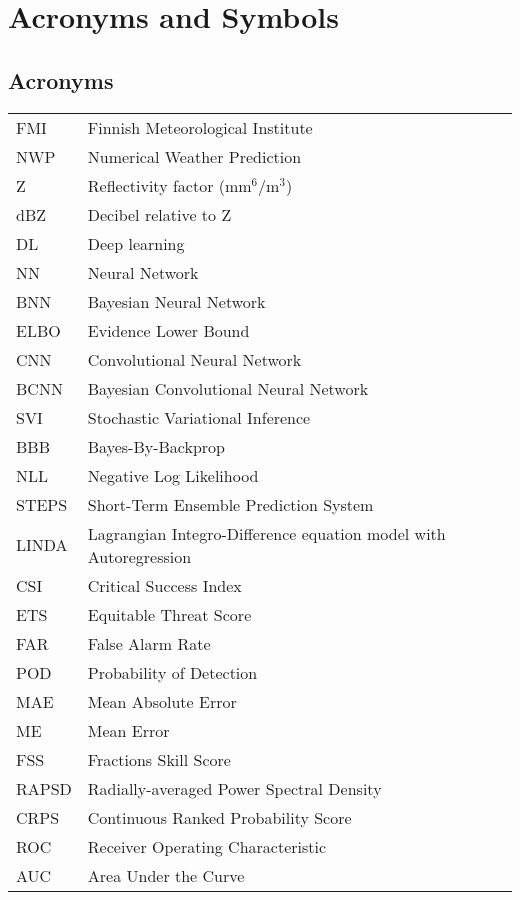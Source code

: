 \chapter*{Acronyms and Symbols}

\section*{Acronyms}

\noindent
\begin{longtable}{@{}p{}p{}@{}}
FMI & Finnish Meteorological Institute \\
NWP & Numerical Weather Prediction \\
Z & Reflectivity factor (mm$^{6}$/m$^{3}$) \\
dBZ & Decibel relative to Z \\
DL & Deep learning \\
NN & Neural Network \\
BNN & Bayesian Neural Network \\
ELBO & Evidence Lower Bound \\
CNN & Convolutional Neural Network \\
BCNN & Bayesian Convolutional Neural Network \\
SVI & Stochastic Variational Inference \\
BBB & Bayes-By-Backprop \\
NLL & Negative Log Likelihood \\
STEPS & Short-Term Ensemble Prediction System \\
LINDA & Lagrangian Integro-Difference equation model with Autoregression\\
CSI & Critical Success Index \\
ETS & Equitable Threat Score \\
FAR & False Alarm Rate \\
POD & Probability of Detection \\
MAE & Mean Absolute Error \\
ME & Mean Error \\
FSS & Fractions Skill Score \\
RAPSD & Radially-averaged Power Spectral Density \\
CRPS & Continuous Ranked Probability Score \\
ROC & Receiver Operating Characteristic \\
AUC & Area Under the Curve \\
\end{longtable}

